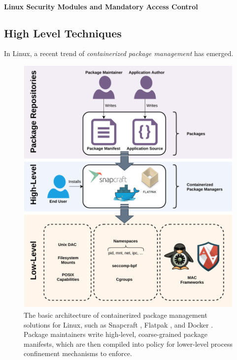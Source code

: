 \documentclass[dvipsnames, 12pt]{article}
\begin{document}

\paragraph*{Linux Security Modules and Mandatory Access Control}


\subsection{High Level Techniques}
\label{sec:high-level}

In Linux, a recent trend of \textit{containerized package management} has emerged.

\begin{figure}[htpb]
    \centering
    \includegraphics[width=0.8\linewidth]{figs/high-level.pdf}
    \caption{
        The basic architecture of containerized package management solutions for
        Linux, such as Snapcraft \cite{snap}, Flatpak \cite{flatpak}, and Docker
        \cite{docker}. Package maintainers write high-level, coarse-grained
        package manifests, which are then compiled into policy for lower-level
        process confinement mechanisms to enforce.
    }%
    \label{fig:containerized}
\end{figure}
\end{document}
